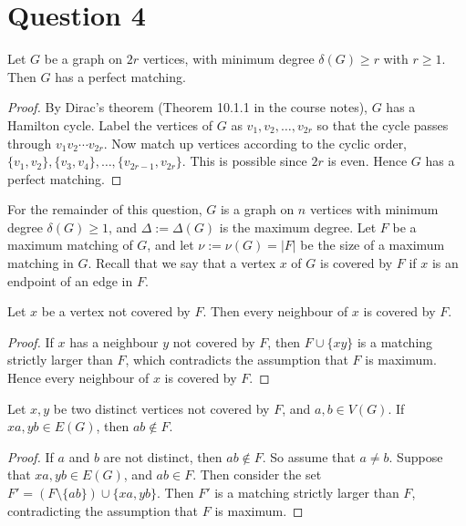 \documentclass{unswmaths}
\begin{document}
\section*{Question 4}
\begin{proposition}[Part (a)]
\label{4a}
    Let $G$ be a graph on $2r$ vertices, with minimum degree $\delta(G) \geq r$
    with $r \geq 1$. Then $G$ has a perfect matching.
\end{proposition}
\begin{proof}
    By Dirac's theorem (Theorem 10.1.1 in the course notes), $G$ has a Hamilton cycle.
    Label the vertices of $G$ as $v_1,v_2,\ldots,v_{2r}$ so that the cycle
    passes through $v_1v_2\cdots v_{2r}$. Now match up vertices
    according to the cyclic order, $\{v_1,v_2\},\{v_3,v_4\},\ldots,\{v_{2r-1},v_{2r}\}$.
    This is possible since $2r$ is even. Hence $G$ has a perfect matching.
\end{proof}
For the remainder of this question, $G$ is a graph on $n$ vertices with minimum
degree $\delta(G) \geq 1$, and $\Delta := \Delta(G)$ is the maximum degree.
Let $F$ be a maximum matching of $G$, and let $\nu := \nu(G) = |F|$ be the size of
a maximum matching in $G$. Recall that we say that a vertex $x$ of $G$
is covered by $F$ if $x$ is an endpoint of an edge in $F$.
\begin{proposition}[Part (b) i]
\label{4b1}
    Let $x$ be a vertex not covered by $F$. Then every neighbour of $x$
    is covered by $F$.
\end{proposition}
\begin{proof}
    If $x$ has a neighbour $y$ not covered by $F$, then $F\cup\{xy\}$
    is a matching strictly larger than $F$, which contradicts the assumption
    that $F$ is maximum. Hence every neighbour of $x$ is covered by $F$.
\end{proof}
\begin{proposition}[Part (b) ii]
\label{4b2}
    Let $x,y$ be two distinct vertices not covered by $F$, and $a,b \in V(G)$.
    If $xa,yb \in E(G)$, then $ab \notin F$.
\end{proposition}
\begin{proof}
    If $a$ and $b$ are not distinct, then $ab \notin F$. So assume that $a \neq b$.
    Suppose that $xa,yb \in E(G)$, and $ab \in F$. Then consider
    the set $F' = (F \setminus \{ab\})\cup \{xa,yb\}$. Then $F'$ is a matching
    strictly larger than $F$, contradicting the assumption that $F$ is maximum.
\end{proof} 
\end{document}
